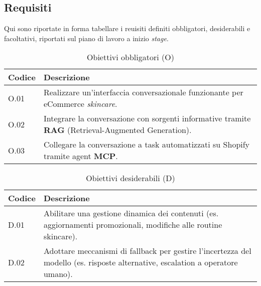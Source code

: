 \subsection{Requisiti}

Qui sono riportate in forma tabellare i reuisiti definiti obbligatori, desiderabili e facoltativi, riportati sul piano di lavoro a inizio \emph{stage}.

\begin{table}[H]
    \centering
    \caption{Obiettivi obbligatori (O)}
    \begin{tabularx}{\textwidth}{|p{}|>{\raggedright\arraybackslash}X|}
      \hline
      \textbf{Codice} & \textbf{Descrizione} \\
      \hline
      O.01 & Realizzare un'interfaccia conversazionale funzionante per eCommerce \textit{skincare}. \\
      \hline
      O.02 & Integrare la conversazione con sorgenti informative tramite \textbf{RAG} (Retrieval-Augmented Generation). \\
      \hline
      O.03 & Collegare la conversazione a task automatizzati su Shopify tramite agent \textbf{MCP}. \\
      \hline
    \end{tabularx}
  \end{table}
  
  \vspace{8pt}
  
  \begin{table}[H]
    \centering
    \caption{Obiettivi desiderabili (D)}
    \begin{tabularx}{\textwidth}{|p{}|>{\raggedright\arraybackslash}X|}
      \hline
      \textbf{Codice} & \textbf{Descrizione} \\
      \hline
      D.01 & Abilitare una gestione dinamica dei contenuti (es. aggiornamenti promozionali, modifiche alle routine skincare). \\
      \hline
      D.02 & Adottare meccanismi di fallback per gestire l'incertezza del modello (es. risposte alternative, escalation a operatore umano). \\
      \hline
    \end{tabularx}
  \end{table}
  
  \vspace{8pt}
  
